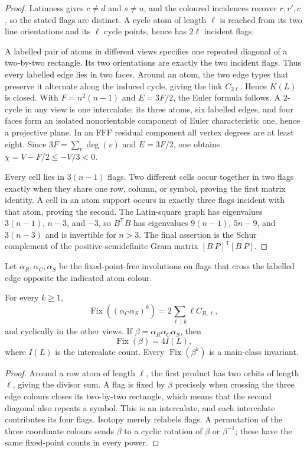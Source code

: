\begin{proof}
Latinness gives $c\ne d$ and $s\ne u$, and the coloured incidences recover
$r,r',c$, so the stated flags are distinct.  A cycle atom of length $\ell$
is reached from its two line orientations and its $\ell$ cycle points, hence
has $2\ell$ incident flags.

A labelled pair of atoms in different views specifies one repeated diagonal
of a two-by-two rectangle.  Its two orientations are exactly the two incident
flags.  Thus every labelled edge lies in two faces.  Around an atom, the two
edge types that preserve it alternate along the induced cycle, giving the
link $C_{2\ell}$.  Hence $K(L)$ is closed.  With
$F=n^2(n-1)$ and $E=3F/2$, the Euler formula follows.  A $2$-cycle in any
view is one intercalate; its three atoms, six labelled edges, and four faces
form an isolated nonorientable component of Euler characteristic one, hence
a projective plane.  In an FFF residual component all vertex degrees are at
least eight.  Since $3F=\sum_v\deg(v)$ and $E=3F/2$, one obtains
$\chi=V-F/2\leq -V/3<0$.

Every cell lies in $3(n-1)$ flags.  Two different cells occur together in
two flags exactly when they share one row, column, or symbol, proving the
first matrix identity.  A cell in an atom support occurs in exactly three
flags incident with that atom, proving the second.  The Latin-square graph
has eigenvalues $3(n-1)$, $n-3$, and $-3$, so $B^{\mathsf T}B$ has
eigenvalues $9(n-1)$, $5n-9$, and $3(n-3)$ and is invertible for $n>3$.
The final assertion is the Schur complement of the positive-semidefinite
Gram matrix $[B\ P]^{\mathsf T}[B\ P]$.
\end{proof}

Let $\alpha_R,\alpha_C,\alpha_S$ be the fixed-point-free involutions on
flags that cross the labelled edge opposite the indicated atom colour.

\begin{proposition}\label{prop:flag-traces}
For every $k\geq1$,
\[
 \operatorname{Fix}((\alpha_C\alpha_S)^k)
 =2\sum_{\ell\mid k}\ell C_{R,\ell},
\]
and cyclically in the other views.  If
$\beta=\alpha_R\alpha_C\alpha_S$, then
\[
 \operatorname{Fix}(\beta)=4I(L),
\]
where $I(L)$ is the intercalate count.  Every
$\operatorname{Fix}(\beta^k)$ is a main-class invariant.
\end{proposition}

\begin{proof}
Around a row atom of length $\ell$, the first product has two orbits of
length $\ell$, giving the divisor sum.  A flag is fixed by $\beta$ precisely
when crossing the three edge colours closes its two-by-two rectangle, which
means that the second diagonal also repeats a symbol.  This is an
intercalate, and each intercalate contributes its four flags.  Isotopy merely
relabels flags.  A permutation of the three coordinate colours sends
$\beta$ to a cyclic rotation of $\beta$ or $\beta^{-1}$; these have the same
fixed-point counts in every power.
\end{proof}

